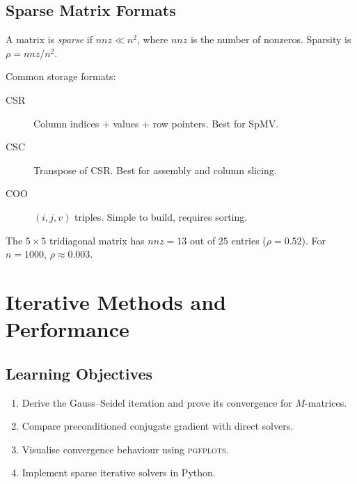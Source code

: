 \documentclass[
    language=english,
    doctype=lecture-notes,
    institution=none,
]{../../omnilatex}
\begin{document}
\section{Sparse Matrix Formats}

\begin{definition}\label{def:sparse}
A matrix is \emph{sparse} if $nnz \ll n^2$, where $nnz$ is the number of
nonzeros. Sparsity is $\rho = nnz / n^2$.
\end{definition}

Common storage formats:
\begin{description}
    \item[CSR] Column indices + values + row pointers. Best for SpMV.
    \item[CSC] Transpose of CSR. Best for assembly and column slicing.
    \item[COO] $(i,j,v)$ triples. Simple to build, requires sorting.
\end{description}

\begin{example}\label{ex:sparsity}
The $5 \times 5$ tridiagonal matrix has $nnz = 13$ out of $25$ entries
($\rho = 0.52$). For $n = 1000$, $\rho \approx 0.003$.
\end{example}

\chapter{Iterative Methods and Performance}

\section*{Learning Objectives}
\begin{enumerate}[label=\textbf{LO\arabic*.}, leftmargin=3em]
    \item Derive the Gauss--Seidel iteration and prove its convergence for $M$-matrices.
    \item Compare preconditioned conjugate gradient with direct solvers.
    \item Visualise convergence behaviour using \textsc{pgfplots}.
    \item Implement sparse iterative solvers in Python.
\end{enumerate}
\end{document}
